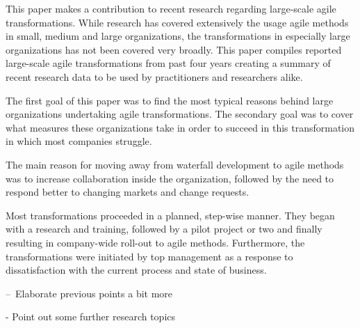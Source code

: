 This paper makes a contribution to recent research regarding large-scale
agile transformations. While research has covered extensively the
usage agile methods in small, medium and large organizations, the
transformations in especially large organizations has not been
covered very broadly. This paper compiles reported large-scale agile
transformations from past four years creating a summary of recent
research data to be used by practitioners and researchers alike.

The first goal of this paper was to find the most typical reasons behind
large organizations undertaking agile transformations. The secondary
goal was to cover what measures these organizations take in order to
succeed in this transformation in which most companies struggle.

The main reason for moving away from waterfall development to agile
methods was to increase collaboration inside the organization, followed
by the need to respond better to changing markets and change requests.

Most transformations proceeded in a planned, step-wise manner. They
began with a research and training, followed by a pilot project or
two and finally resulting in company-wide roll-out to agile methods.
Furthermore, the transformations were initiated by top management as
a response to dissatisfaction with the current process and state of
business.

– Elaborate previous points a bit more


- Point out some further research topics
